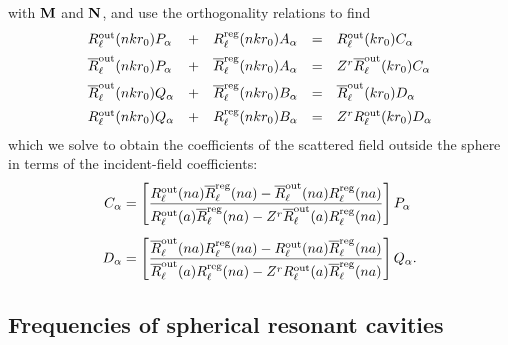 \documentclass[letterpaper]{article}
\newcommand{\RBar}{\overline{R}}
\begin{document}
with $\mathbf{M}$ and $\mathbf{N}$, and use the orthogonality relations
to find
$$\begin{array}{lclcl}
  R\sups{out}_\ell(n k r_0) P_\alpha
 &+&
  R\sups{reg}_\ell(n k r_0) A_\alpha
 &=&
  R\sups{out}_\ell(k r_0) C_\alpha
\\[5pt]
  \RBar\sups{out}_\ell(n k r_0) P_\alpha
 &+&
  \RBar\sups{reg}_\ell(n k r_0) A_\alpha
 &=&
  Z^r \RBar\sups{out}_\ell(k r_0) C_\alpha
\\[5pt]
  \RBar\sups{out}_\ell(n k r_0) Q_\alpha
 &+&
  \RBar\sups{reg}_\ell(n k r_0) B_\alpha
 &=&
  \RBar\sups{out}_\ell(k r_0) D_\alpha
\\[5pt]
  R\sups{out}_\ell(n k r_0) Q_\alpha
 &+& 
  R\sups{reg}_\ell(n k r_0) B_\alpha
 &=& 
  Z^r R\sups{out}_\ell(k r_0) D_\alpha
\end{array}$$
which we solve to obtain the coefficients of the scattered
field outside the sphere in terms of the incident-field 
coefficients:
\begin{subequations}
\begin{align}
 C_\alpha 
&= \left[
   \frac{ R\sups{out}_\ell(na) \RBar\sups{reg}_\ell(na)
         -\RBar\sups{out}_\ell(na) R\sups{reg}_\ell(na)
        }
        { R\sups{out}_\ell(a) \RBar\sups{reg}_\ell(na)
         -Z^r\RBar\sups{out}_\ell(a) R\sups{reg}_\ell(na)
        }
    \right] P_\alpha
\\[5pt]
 D_\alpha 
&= \left[
   \frac{ \RBar\sups{out}_\ell(na) R\sups{reg}_\ell(na)
         -R\sups{out}_\ell(na) \RBar\sups{reg}_\ell(na)
        }
        { \RBar\sups{out}_\ell(a) R\sups{reg}_\ell(na)
         -Z^r R\sups{out}_\ell(a) \RBar\sups{reg}_\ell(na)
        }
    \right] Q_\alpha.
\end{align}
\label{CDAlpha}
\end{subequations}

\subsection{Frequencies of spherical resonant cavities}
\end{document}
